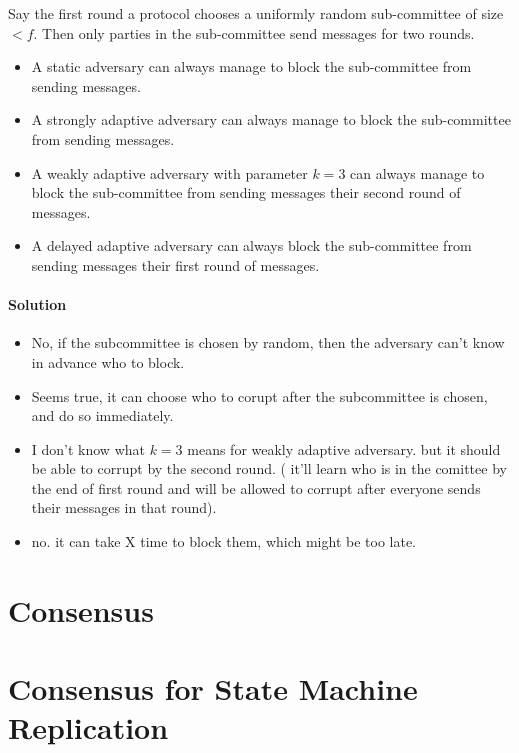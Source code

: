 \begin{xca}
    Say the first round a protocol chooses a uniformly random sub-committee of 
    size $<f$. Then only parties in the sub-committee send messages for two rounds.
    \begin{itemize} 
        \item A static adversary can always manage to block the sub-committee from sending messages.
        \item A strongly adaptive adversary can always manage to block the sub-committee from sending messages.
        \item A weakly adaptive adversary with parameter $k=3$ can always manage to block the sub-committee from sending messages their second round of messages.
        \item A delayed adaptive adversary can always block the sub-committee from sending messages their first round of messages.
    \end{itemize}
    
\paragraph{Solution}
\begin{itemize}
    \item No, if the subcommittee is chosen by random, then the adversary can't know in advance who to block.
    \item Seems true, it can choose who to corupt after the subcommittee is chosen, and do so immediately.
    \item I don't know what $k=3$ means for weakly adaptive adversary. but it should be able to corrupt by the second round.
    ( it'll learn who is in the comittee by the end of first round and will be allowed to corrupt after everyone sends their messages in that round).
    \item no. it can take X time to block them, which might be too late.
\end{itemize}
\end{xca}

\section{Consensus}
\section{Consensus for State Machine Replication}

